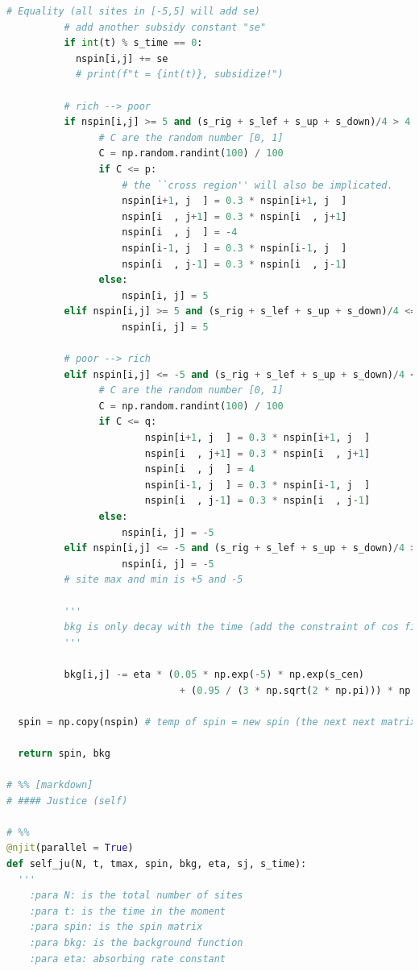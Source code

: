 \documentclass[10pt]{article}
\begin{document}
\begin{lstlisting}[language={Python}]
          # Equality (all sites in [-5,5] will add se)
          # add another subsidy constant "se"
          if int(t) % s_time == 0:
            nspin[i,j] += se
            # print(f"t = {int(t)}, subsidize!")
            
          # rich --> poor
          if nspin[i,j] >= 5 and (s_rig + s_lef + s_up + s_down)/4 > 4:
                # C are the random number [0, 1]
                C = np.random.randint(100) / 100
                if C <= p:
                    # the ``cross region'' will also be implicated.
                    nspin[i+1, j  ] = 0.3 * nspin[i+1, j  ] 
                    nspin[i  , j+1] = 0.3 * nspin[i  , j+1]
                    nspin[i  , j  ] = -4
                    nspin[i-1, j  ] = 0.3 * nspin[i-1, j  ]
                    nspin[i  , j-1] = 0.3 * nspin[i  , j-1]
                else:
                    nspin[i, j] = 5
          elif nspin[i,j] >= 5 and (s_rig + s_lef + s_up + s_down)/4 <= 4:
                    nspin[i, j] = 5

          # poor --> rich
          elif nspin[i,j] <= -5 and (s_rig + s_lef + s_up + s_down)/4 < -4:
                # C are the random number [0, 1]
                C = np.random.randint(100) / 100
                if C <= q:
                        nspin[i+1, j  ] = 0.3 * nspin[i+1, j  ] 
                        nspin[i  , j+1] = 0.3 * nspin[i  , j+1]
                        nspin[i  , j  ] = 4
                        nspin[i-1, j  ] = 0.3 * nspin[i-1, j  ]
                        nspin[i  , j-1] = 0.3 * nspin[i  , j-1]
                else:
                    nspin[i, j] = -5    
          elif nspin[i,j] <= -5 and (s_rig + s_lef + s_up + s_down)/4 >= -4:
                    nspin[i, j] = -5
          # site max and min is +5 and -5

          '''
          bkg is only decay with the time (add the constraint of cos finction with the period t_max)
          '''      

          bkg[i,j] -= eta * (0.05 * np.exp(-5) * np.exp(s_cen) 
                              + (0.95 / (3 * np.sqrt(2 * np.pi))) * np.exp(-np.square(s_cen)/(2 * np.square(3)))) * bkg[i,j] * np.sin(2 * np.pi * t/tmax)

  spin = np.copy(nspin) # temp of spin = new spin (the next next matrix)

  return spin, bkg

# %% [markdown]
# #### Justice (self)

# %%
@njit(parallel = True)
def self_ju(N, t, tmax, spin, bkg, eta, sj, s_time):
  '''
    :para N: is the total number of sites
    :para t: is the time in the moment
    :para spin: is the spin matrix
    :para bkg: is the background function
    :para eta: absorbing rate constant


\end{lstlisting}
\end{document}
